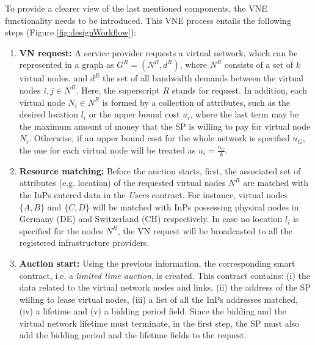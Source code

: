 To provide a clearer view of the last mentioned components, the VNE functionality needs to be introduced. This VNE process entails the following steps (Figure \ref{fig:designWorkflow}):

\begin{enumerate}
    \item \textbf{VN request:} A service provider requests a virtual network, which can be represented in a graph as $G^{R} = (N^{R} , d^{R})$, where $N^{R}$ consists of a set of $k$ virtual nodes, and $d^{R}$ the set of all bandwidth demands between the virtual nodes $i,j \in N^{R}$. Here, the superscript $R$ stands for request. In addition, each virtual node $N_i \in N^{R}$ is formed by a collection of attributes, such as the desired location $l_{i}$ or the upper bound cost $u_{i}$, where the last term may be the maximum amount of money that the SP is willing to pay for virtual node $N_i$. Otherwise, if an upper bound cost for the whole network is specified $u_{G}$, the one for each virtual node will be treated as $u_{i} = \frac{u_{G}}{k}$.
    \item \textbf{Resource matching:} Before the auction starts, first, the associated set of attributes (e.g. location) of the requested virtual nodes $N^{R}$ are matched with the InPs entered data in the \textit{Users} contract. For instance, virtual nodes $\{A,B\}$ and $\{C,D\}$ will be matched with InPs possessing physical nodes in Germany (DE) and Switzerland (CH) respectively. In case no location $l_{i}$ is specified for the nodes $N^{R}$, the VN request will be broadcasted to all the registered infrastructure providers.
	\item \textbf{Auction start:} Using the previous information, the corresponding smart contract, i.e. a \textit{limited time auction}, is created. This contract contains: (i) the data related to the virtual network nodes and links, (ii) the address of the SP willing to lease virtual nodes, (iii) a list of all the InPs addresses matched, (iv) a lifetime and (v) a bidding period field. Since the bidding and the virtual network lifetime must terminate, in the first step, the SP must also add the bidding period and the lifetime fields to the request.

\end{enumerate}
